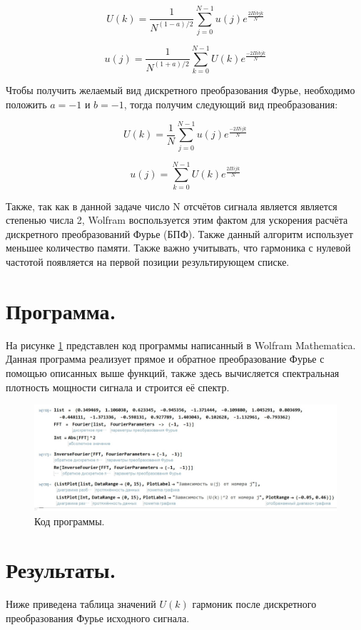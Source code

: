 \documentclass[diploma]{nanolab2015}
\begin{document}
$$U(k) = \frac{1}{N^{(1-a)/2}} \sum_{j=0}^{N-1} u(j) e^{\frac{ 2\Pi i b j k}{N}}$$

$$u(j) = \frac{1}{N^{(1+a)/2}} \sum_{k=0}^{N-1} U(k) e^{\frac{- 2\Pi i b j k}{N}}$$

Чтобы получить желаемый вид дискретного преобразования Фурье, необходимо положить $a = -1$ и $b = -1$, тогда получим следующий вид преобразования:

$$U(k) = \frac{1}{N} \sum_{j=0}^{N-1} u(j) e^{\frac{- 2\Pi i j k}{N}}$$

$$u(j) = \sum_{k=0}^{N-1} U(k) e^{\frac{2\Pi i j k}{N}}$$

Также, так как в данной задаче число N отсчётов сигнала является является степенью числа 2, Wolfram воспользуется этим фактом для ускорения расчёта дискретного преобразований Фурье (БПФ). Также данный алгоритм использует меньшее количество памяти. Также важно учитывать, что гармоника с нулевой частотой появляется на первой позиции результирующем списке.

 \section{Программа.}
На рисунке \ref{pic1} представлен код программы написанный в Wolfram Mathematica. Данная программа реализует прямое и обратное преобразование Фурье с помощью описанных выше функций, также здесь вычисляется спектральная плотность мощности сигнала и строится её спектр.

\begin{figure}[h!]
\centering
\includegraphics[scale=0.38]{prog.jpg}
\caption{\label{pic1}Код программы.}
\end{figure}
 
  \section{Результаты.} 
  Ниже приведена таблица значений $U(k)$ гармоник после дискретного преобразования Фурье исходного сигнала.
  
\end{document}
